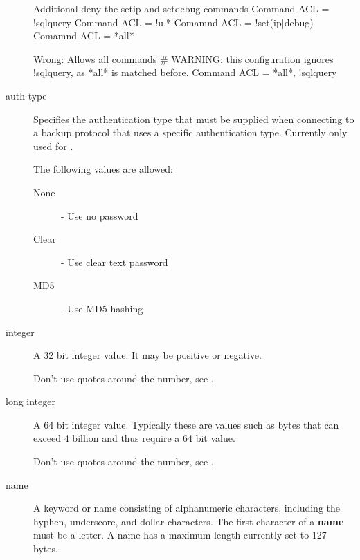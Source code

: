 \begin{description}
\begin{bconfig}{Additional deny the setip and setdebug commands}
Command ACL = !sqlquery
Command ACL = !u.*
Comamnd ACL = !set(ip|debug)
Comamnd ACL = *all*
\end{bconfig}

\begin{bconfig}{Wrong: Allows all commands}
# WARNING: this configuration ignores !sqlquery, as *all* is matched before.
Command ACL = *all*, !sqlquery
\end{bconfig}

\item [auth-type]
    \label{DataTypeAuthType}
Specifies the authentication type that must be supplied when connecting to
a backup protocol that uses a specific authentication type.
Currently only used for .

The following values are allowed:
\begin{description}
\item[None] - Use no password
\item[Clear] - Use clear text password
\item[MD5] - Use MD5 hashing
\end{description}


\item [integer]
    \label{DataTypeInteger}
   A 32 bit integer value. It may be positive or negative.

   Don't use quotes around the number, see .


\item [long integer]
    \label{DataTypeLongInteger}
   A 64 bit integer value. Typically these  are values such as bytes that can
exceed 4 billion and thus  require a 64 bit value.

   Don't use quotes around the number, see .


\item [name]
    \label{DataTypeName}
   A keyword or name consisting of alphanumeric characters, including the
hyphen, underscore, and dollar  characters. The first character of a {\bf
name} must be  a letter.  A name has a maximum length currently set to 127
bytes.


\end{description}
